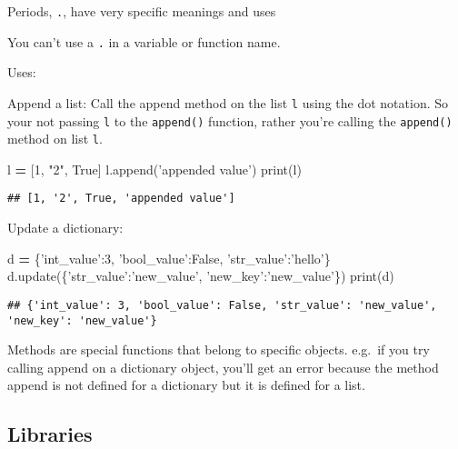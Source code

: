 \documentclass[]{book}
\newenvironment{Shaded}{\begin{snugshade}}{\end{snugshade}}
\newcommand{\BuiltInTok}[1]{#1}
\newcommand{\DecValTok}[1]{\textcolor[rgb]{0.00,0.00,0.81}{#1}}
\newcommand{\NormalTok}[1]{#1}
\newcommand{\OperatorTok}[1]{\textcolor[rgb]{0.81,0.36,0.00}{\textbf{#1}}}
\newcommand{\StringTok}[1]{\textcolor[rgb]{0.31,0.60,0.02}{#1}}
\newcommand{\VariableTok}[1]{\textcolor[rgb]{0.00,0.00,0.00}{#1}}
\theoremstyle{definition}
\theoremstyle{definition}
\theoremstyle{definition}
\theoremstyle{remark}
\begin{document}
Periods, \texttt{.}, have very specific meanings and uses

You can't use a \texttt{.} in a variable or function name.

Uses:

Append a list: Call the append method on the list \texttt{l} using the
dot notation. So your not passing \texttt{l} to the \texttt{append()}
function, rather you're calling the \texttt{append()} method on list
\texttt{l}.

\begin{Shaded}
\begin{Highlighting}[]
\NormalTok{l }\OperatorTok{=}\NormalTok{ [}\DecValTok{1}\NormalTok{, }\StringTok{"2"}\NormalTok{, }\VariableTok{True}\NormalTok{]}
\NormalTok{l.append(}\StringTok{'appended value'}\NormalTok{)}
\BuiltInTok{print}\NormalTok{(l)}
\end{Highlighting}
\end{Shaded}

\begin{verbatim}
## [1, '2', True, 'appended value']
\end{verbatim}

Update a dictionary:

\begin{Shaded}
\begin{Highlighting}[]
\NormalTok{d }\OperatorTok{=}\NormalTok{ \{}\StringTok{'int_value'}\NormalTok{:}\DecValTok{3}\NormalTok{, }\StringTok{'bool_value'}\NormalTok{:}\VariableTok{False}\NormalTok{, }\StringTok{'str_value'}\NormalTok{:}\StringTok{'hello'}\NormalTok{\}}
\NormalTok{d.update(\{}\StringTok{'str_value'}\NormalTok{:}\StringTok{'new_value'}\NormalTok{, }\StringTok{'new_key'}\NormalTok{:}\StringTok{'new_value'}\NormalTok{\})}
\BuiltInTok{print}\NormalTok{(d)}
\end{Highlighting}
\end{Shaded}

\begin{verbatim}
## {'int_value': 3, 'bool_value': False, 'str_value': 'new_value', 'new_key': 'new_value'}
\end{verbatim}

Methods are special functions that belong to specific objects. e.g.~if
you try calling append on a dictionary object, you'll get an error
because the method append is not defined for a dictionary but it is
defined for a list.

\hypertarget{libraries}{%
\subsection{Libraries}\label{libraries}}
\end{document}
